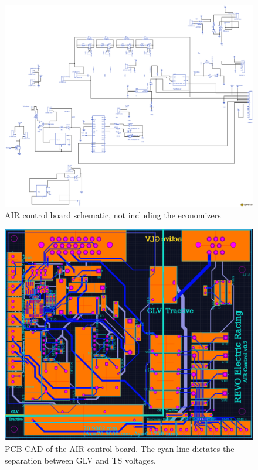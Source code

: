 \documentclass{article}
\begin{document}

        \begin{figure}
            \includegraphics[width=\textheight]{aircntrlschem}
            \caption{AIR control board schematic, not including the economizers}
            \label{aircntrlschem}
        \end{figure}

        \begin{figure}[H]
            \centering
            \includegraphics[width = 0.8 \textwidth]{aircntrlCAD}
            \caption{PCB CAD of the AIR control board. The cyan line dictates the separation between GLV and TS voltages.}
            \label{AIRcntrlPCB}
        \end{figure}
\end{document}
